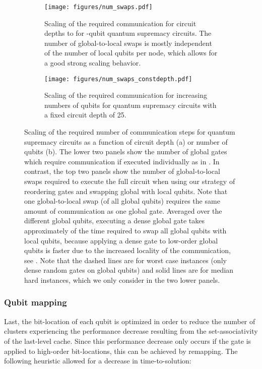 \documentclass[sigconf]{acmart}
\begin{document}
\begin{figure*}
	\begin{subfigure}{.45\linewidth}
	\centering
	\texttt{[image: figures/num\_swaps.pdf]}
	
	\caption{Scaling of the required communication for circuit depths  to  for -qubit quantum supremacy circuits. The number of global-to-local swaps is mostly independent of the number of local qubits per node, which allows for a good strong scaling behavior.}
		          
	\label{fig:swaps_vs_global_gates}
	\end{subfigure}\hspace{20pt}
	\begin{subfigure}{.45\linewidth}
	\centering
	\texttt{[image: figures/num\_swaps\_constdepth.pdf]}
	\caption{Scaling of the required communication for increasing numbers of qubits for quantum supremacy circuits with a fixed circuit depth of 25.
		\vspace{20pt}}
	
	\label{fig:swaps_scaling_with_problem_size}
	\end{subfigure}
	\caption{Scaling of the required number of communication steps for quantum supremacy circuits as a function of circuit depth (a) or number of qubits (b). The lower two panels show the number of global gates which require communication if executed individually as in \cite{boixo2016characterizing}. In contrast, the top two panels show the number of global-to-local swaps required to execute the full circuit when using our strategy of reordering gates and swapping global with local qubits. Note that one global-to-local swap (of all global qubits) requires the same amount of communication as one global gate. Averaged over the different global qubits, executing a dense global gate takes approximately  of the time required to swap all global qubits with local qubits, because applying a dense gate to low-order global qubits is faster due to the increased locality of the communication, see \cite{boixo2016characterizing}. Note that the dashed lines are for worst case instances (only dense random gates on global qubits) and solid lines are for median hard instances, which we only consider in the two lower panels.}
\end{figure*}



\subsubsection{Qubit mapping}
Last, the bit-location of each qubit is optimized in order to reduce the number of clusters experiencing the performance decrease resulting from the set-associativity of the last-level cache. Since this performance decrease only occurs if the gate is applied to high-order bit-locations, this can be achieved by remapping. The following heuristic allowed for a  decrease in time-to-solution:
\end{document}
